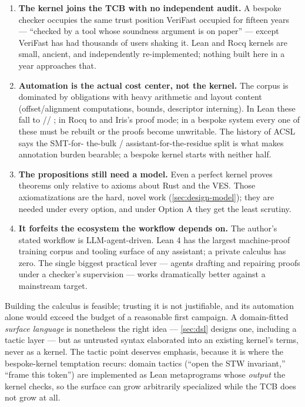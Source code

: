 \begin{enumerate}[leftmargin=1.6em]
\item \textbf{The kernel joins the TCB with no independent audit.} A
  bespoke checker occupies the same trust position VeriFast occupied for
  fifteen years~\cite{foundationalverifast2026} --- ``checked by a tool
  whose soundness argument is on paper'' --- except VeriFast has had
  thousands of users shaking it. Lean and Rocq kernels are small,
  ancient, and independently re-implemented; nothing built here in a year
  approaches that.
\item \textbf{Automation is the actual cost center, not the kernel.}
  The corpus is dominated by obligations with heavy arithmetic and
  layout content (offset/alignment computations, bounds, descriptor
  interning). In Lean these fall to //%
  ; in Rocq to  and Iris's proof mode; in a
  bespoke system every one of these must be rebuilt or the proofs
  become unwritable. The history of ACSL~\cite{acsl} says the SMT-for-%
  the-bulk / assistant-for-the-residue split is what makes annotation
  burden bearable; a bespoke kernel starts with neither half.
\item \textbf{The propositions still need a model.} Even a perfect
  kernel proves theorems only relative to axioms about Rust and the VES.
  Those axiomatizations are the hard, novel work
  (\cref{sec:design-model}); they are needed under every option, and
  under Option A they get the least scrutiny.
\item \textbf{It forfeits the ecosystem the workflow depends on.} The
  author's stated workflow is LLM-agent-driven. Lean 4 has the largest
  machine-proof training corpus and tooling surface of any assistant;
  a private calculus has zero. The single biggest practical lever ---
  agents drafting and repairing proofs under a checker's supervision ---
  works dramatically better against a mainstream target.
\end{enumerate}

\begin{riskbox}
Building the calculus is feasible; trusting it is not justifiable,
and its automation alone would exceed the budget of a reasonable
first campaign. A domain-fitted \emph{surface language} is
nonetheless the right idea --- \cref{sec:dsl} designs one, including a
tactic layer --- but as untrusted syntax elaborated into an existing
kernel's terms, never as a kernel. The tactic point deserves
emphasis, because it is where the bespoke-kernel temptation recurs:
domain tactics (``open the STW invariant,'' ``frame this token'') are
implemented as Lean metaprograms whose \emph{output} the kernel
checks, so the surface can grow arbitrarily specialized while the TCB
does not grow at all.
\end{riskbox}

